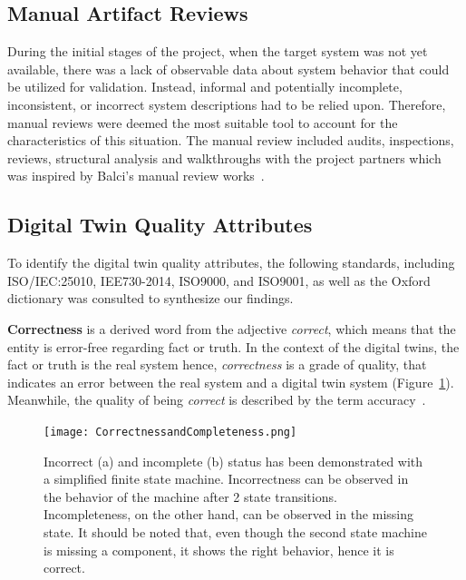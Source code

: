 \documentclass{llncs}
\begin{document}
    \subsection{Manual Artifact Reviews}
    During the initial stages of the project, when the target system was not yet available,
    there was a lack of observable data about system behavior that could be utilized for validation. 
    Instead, informal and potentially incomplete, inconsistent, or incorrect system descriptions had to be relied upon. 
    Therefore, manual reviews were deemed the most suitable tool to account for the characteristics of this situation.
    The manual review included audits, inspections, reviews, structural analysis and walkthroughs 
    with the project partners which was inspired by Balci's manual review works~\cite{balcitechniques}. 
    
    \subsection{Digital Twin Quality Attributes}\label{section:Digital Twin Quality Attributes}
    To identify the digital twin quality attributes, the following standards, including ISO/IEC:25010, IEE730-2014, ISO9000, and ISO9001, 
    as well as the Oxford dictionary was consulted to 
    synthesize our findings\cite{ISO9000,ISO90012015,ISO/IEC:25010,IEE7302014,OxfordDictionary}.

    \textbf{Correctness} is a  derived word from the adjective \textit{correct}, which means that the entity is error-free regarding fact or truth. 
    In the context of the digital twins, the fact or truth is the real system hence, \textit{correctness} is a grade of quality, 
    that indicates an error between the real system and a digital twin system (Figure~\ref{fig:CorrectnessAndCompleteness}).
    Meanwhile, the quality of being \textit{correct} is described by the term accuracy~\cite{OxfordDictionary}. 

    \begin{figure}[htbp]
        \centering
        \texttt{[image: CorrectnessandCompleteness.png]}
        \caption{Incorrect (a) and incomplete (b) status has been demonstrated with a simplified finite state machine. Incorrectness can be observed in the behavior 
        of the machine after 2 state transitions. Incompleteness, on the other hand, can be observed in the missing state. It should be noted that, even though the second state machine is missing a 
        component, it shows the right behavior, hence it is correct.}\label{fig:CorrectnessAndCompleteness}
    \end{figure}
\end{document}
